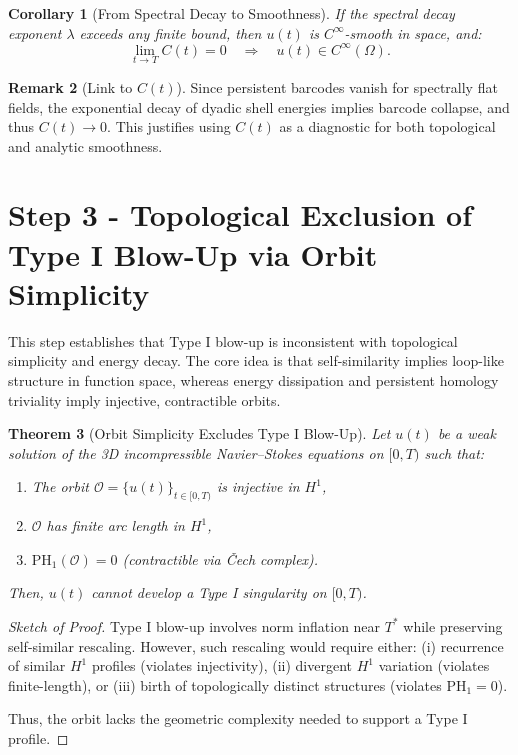 \documentclass[11pt]{article}
\newtheorem{theorem}{Theorem}[section]
\newtheorem{corollary}[theorem]{Corollary}
\theoremstyle{definition}
\newtheorem{remark}[theorem]{Remark}
\begin{document}
\begin{corollary}[From Spectral Decay to Smoothness]
If the spectral decay exponent $\lambda$ exceeds any finite bound, then $u(t)$ is $C^\infty$-smooth in space, and:
\[
\lim_{t \to T} C(t) = 0 \quad \Rightarrow \quad u(t) \in C^\infty(\Omega).
\]
\end{corollary}

\begin{remark}[Link to $C(t)$]
Since persistent barcodes vanish for spectrally flat fields, the exponential decay of dyadic shell energies implies barcode collapse, and thus $C(t) \to 0$. This justifies using $C(t)$ as a diagnostic for both topological and analytic smoothness.
\end{remark}


\section{Step 3 - Topological Exclusion of Type I Blow-Up via Orbit Simplicity}

This step establishes that Type I blow-up is inconsistent with topological simplicity and energy decay. The core idea is that self-similarity implies loop-like structure in function space, whereas energy dissipation and persistent homology triviality imply injective, contractible orbits.

\begin{theorem}[Orbit Simplicity Excludes Type I Blow-Up]
Let $u(t)$ be a weak solution of the 3D incompressible Navier–Stokes equations on $[0,T)$ such that:
\begin{enumerate}
    \item The orbit $\mathcal{O} = \{u(t)\}_{t \in [0,T)}$ is injective in $H^1$,
    \item $\mathcal{O}$ has finite arc length in $H^1$,
    \item $\mathrm{PH}_1(\mathcal{O}) = 0$ (contractible via Čech complex).
\end{enumerate}
Then, $u(t)$ cannot develop a Type I singularity on $[0,T)$.
\end{theorem}

\begin{proof}[Sketch of Proof]
Type I blow-up involves norm inflation near $T^*$ while preserving self-similar rescaling.  
However, such rescaling would require either:  
(i) recurrence of similar $H^1$ profiles (violates injectivity),  
(ii) divergent $H^1$ variation (violates finite-length), or  
(iii) birth of topologically distinct structures (violates $\mathrm{PH}_1 = 0$).  

Thus, the orbit lacks the geometric complexity needed to support a Type I profile.
\end{proof}
        
\end{document}
